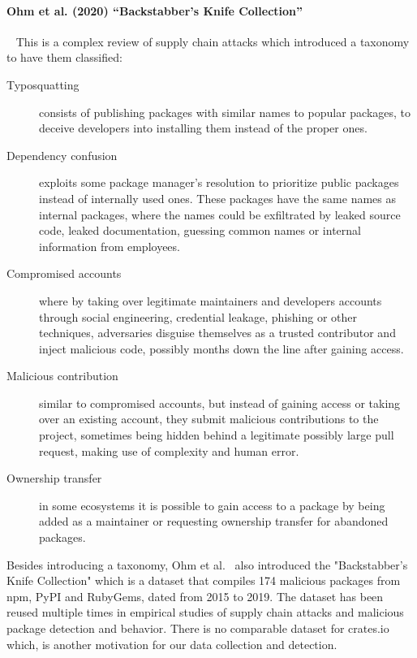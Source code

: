 \paragraph{Ohm et al. (2020) ``Backstabber's Knife Collection''}~\cite{ohm2020backstabber}
This is a complex review of supply chain attacks which introduced a taxonomy to have them classified:
\begin{description}
	\item[Typosquatting] consists of publishing packages with similar names to popular packages, to deceive developers into installing them instead of the proper ones.
	\item[Dependency confusion] exploits some package manager's resolution to prioritize public packages instead of internally used ones. These packages have the same names as internal packages, where the names could be exfiltrated by leaked source code, leaked documentation, guessing common names or internal information from employees.
	\item[Compromised accounts] where by taking over legitimate maintainers and developers accounts through social engineering, credential leakage, phishing or other techniques, adversaries disguise themselves as a trusted contributor and inject malicious code, possibly months down the line after gaining access.
	\item[Malicious contribution] similar to compromised accounts, but instead of gaining access or taking over an existing account, they submit malicious contributions to the project, sometimes being hidden behind a legitimate possibly large pull request, making use of complexity and human error.
	\item[Ownership transfer] in some ecosystems it is possible to gain access to a package by being added as a maintainer or requesting ownership transfer for abandoned packages.
\end{description}
Besides introducing a taxonomy, Ohm et al.~\cite{ohm2020backstabber} also introduced the "Backstabber's Knife Collection" which is a dataset that compiles 174 malicious packages from npm, PyPI and RubyGems, dated from 2015 to 2019. The dataset has been reused multiple times in empirical studies of supply chain attacks and malicious package detection and behavior.
There is no comparable dataset for crates.io which, is another motivation for our data collection and detection.

